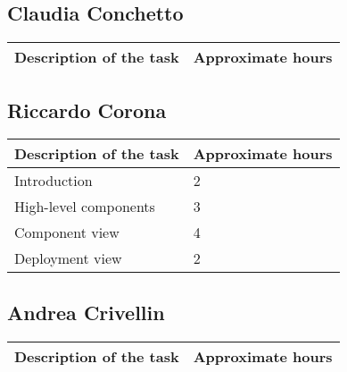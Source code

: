 
%

\subsection{Claudia Conchetto}
\begin{table}[h!]
\begin{tabular}{|l|l|}
\hline
\textbf{Description of the task} & \textbf{Approximate hours} \\ \hline
\end{tabular}
\end{table}

\subsection{Riccardo Corona}
\begin{table}[h!]
\begin{tabular}{|l|l|}
\hline
\textbf{Description of the task} & \textbf{Approximate hours} \\ \hline
Introduction & 2 \\ \hline
High-level components & 3 \\ \hline
Component view & 4 \\ \hline
Deployment view & 2 \\ \hline
\end{tabular}
\end{table}

\subsection{Andrea Crivellin}
\begin{table}[h!]
\begin{tabular}{|l|l|}
\hline
\textbf{Description of the task} & \textbf{Approximate hours} \\ \hline
\end{tabular}
\end{table}

%